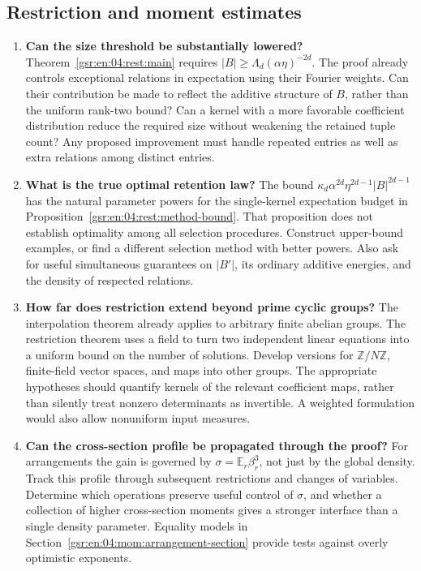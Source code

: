 \documentclass[11pt,letterpaper]{article}
\numberwithin{equation}{section}
\theoremstyle{definition}
\theoremstyle{remark}
\newcommand{\E}{\mathbb E}
\newcommand{\1}{\mathbf 1}
\begin{document}
\subsection{Restriction and moment estimates}

\begin{enumerate}[label=\textbf{Q\arabic*.},leftmargin=2.6em,resume]
\item \textbf{Can the size threshold be substantially lowered?}
Theorem~\ref{gsr:en:04:rest:main} requires
\(|B|\geq\Lambda_d(\alpha\eta)^{-2d}\).
The proof already controls exceptional relations in expectation using
their Fourier weights.  Can their contribution be made to reflect the
additive structure of \(B\), rather than the uniform rank-two bound?
Can a kernel with a more favorable coefficient distribution reduce the
required size without weakening the retained tuple count?  Any proposed
improvement must handle repeated entries as well as extra relations among
distinct entries.

\item \textbf{What is the true optimal retention law?}
The bound
\(\kappa_d\alpha^{2d}\eta^{2d-1}|B|^{2d-1}\) has the natural parameter
powers for the single-kernel expectation budget in
Proposition~\ref{gsr:en:04:rest:method-bound}.  That proposition does not establish
optimality among all selection procedures.  Construct upper-bound
examples, or find a different selection method with better powers.
Also ask for useful simultaneous guarantees on \(|B'|\), its ordinary
additive energies, and the density of respected relations.

\item \textbf{How far does restriction extend beyond prime cyclic groups?}
The interpolation theorem already applies to arbitrary finite abelian
groups.  The restriction theorem uses a field to turn two independent
linear equations into a uniform bound on the number of solutions.
Develop versions for \(\mathbb Z/N\mathbb Z\), finite-field vector
spaces, and maps into other groups.  The appropriate hypotheses should
quantify kernels of the relevant coefficient maps, rather than silently
treat nonzero determinants as invertible.  A weighted formulation would
also allow nonuniform input measures.

\item \textbf{Can the cross-section profile be propagated through the proof?}
For arrangements the gain is governed by
\(\sigma=\E_r\beta_r^3\), not just by the global density.
Track this profile through subsequent restrictions and changes of
variables.  Determine which operations preserve useful control of
\(\sigma\), and whether a collection of higher cross-section moments
gives a stronger interface than a single density parameter.  Equality
models in Section~\ref{gsr:en:04:mom:arrangement-section} provide tests against
overly optimistic exponents.
\end{enumerate}
\end{document}
